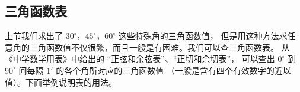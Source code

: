 \subsection{三角函数表}\label{subsec:15-3}

上节我们求出了 $30^\circ$，$45^\circ$，$60^\circ$ 这些特殊角的三角函数值，
但是用这种方法求任意角的三角函数值不仅很繁，而且一般是有困难。我们可以查三角函数表。
从《中学数学用表》中给出的 “正弦和余弦表”、“正切和余切表”，
可以查出 $0^\circ$ 到 $90^\circ$ 间每隔 $1'$ 的各个角所对应的三角函数值
（一般是含有四个有效数字的近以值）。下面举例说明表的用法。


\begingroup
{}




\endgroup

